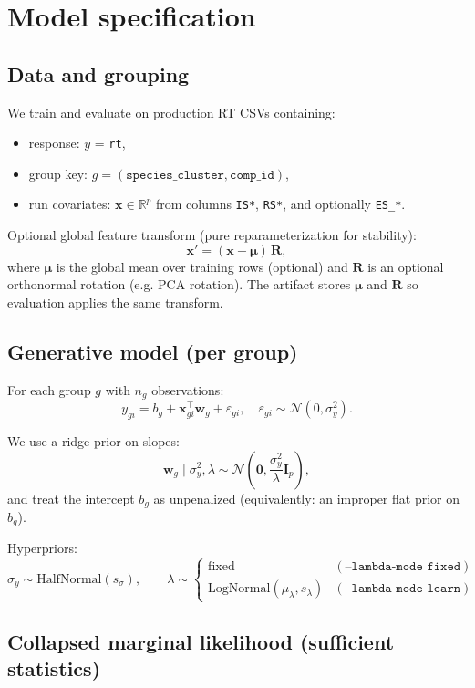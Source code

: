 \documentclass[11pt]{article}
\begin{document}
\section{Model specification}

\subsection{Data and grouping}

We train and evaluate on production RT CSVs containing:
\begin{itemize}
  \item response: $y$ = \texttt{rt},
  \item group key: $g = (\texttt{species\_cluster}, \texttt{comp\_id})$,
  \item run covariates: $\bm{x} \in \mathbb{R}^p$ from columns \texttt{IS*}, \texttt{RS*}, and optionally \texttt{ES\_*}.
\end{itemize}

Optional global feature transform (pure reparameterization for stability):
\[
  \bm{x}' = (\bm{x} - \bm{\mu}) \, \bm{R},
\]
where $\bm{\mu}$ is the global mean over training rows (optional) and $\bm{R}$ is an optional orthonormal rotation
(e.g. PCA rotation). The artifact stores $\bm{\mu}$ and $\bm{R}$ so evaluation applies the same transform.

\subsection{Generative model (per group)}

For each group $g$ with $n_g$ observations:
\[
  y_{gi} = b_g + \bm{x}_{gi}^\top \bm{w}_g + \varepsilon_{gi}, \quad
  \varepsilon_{gi} \sim \mathcal{N}(0, \sigma_y^2).
\]

We use a ridge prior on slopes:
\[
  \bm{w}_g \mid \sigma_y^2, \lambda \sim \mathcal{N}\!\left(\bm{0}, \frac{\sigma_y^2}{\lambda}\bm{I}_p\right),
\]
and treat the intercept $b_g$ as unpenalized (equivalently: an improper flat prior on $b_g$).

Hyperpriors:
\[
  \sigma_y \sim \mathrm{HalfNormal}(s_{\sigma}), \qquad
  \lambda \sim
  \begin{cases}
    \text{fixed} & (\texttt{--lambda-mode fixed}) \\
    \mathrm{LogNormal}(\mu_{\lambda}, s_{\lambda}) & (\texttt{--lambda-mode learn})
  \end{cases}
\]

\subsection{Collapsed marginal likelihood (sufficient statistics)}
\end{document}
